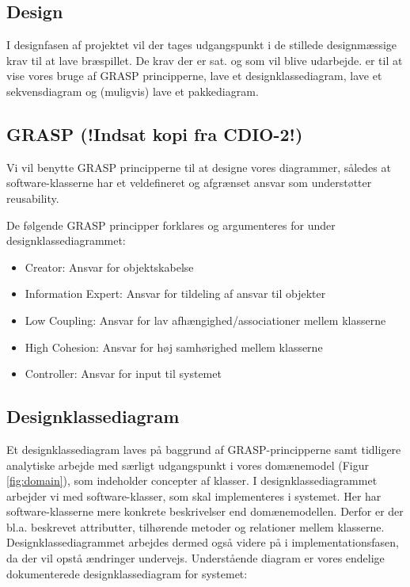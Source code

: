 \documentclass[../main.tex]{subfiles}
\begin{document}
\begin{flushleft} 
\section{Design}

I designfasen af projektet vil der tages udgangspunkt i de stillede designmæssige krav til at lave bræspillet. De krav der er sat. og som vil blive udarbejde. er til at vise vores bruge af GRASP principperne, lave et designklassediagram, lave et sekvensdiagram og (muligvis) lave et pakkediagram. 


\subsection{GRASP (!Indsat kopi fra CDIO-2!)}

Vi vil benytte GRASP principperne til at designe vores diagrammer, således at software-klasserne har et veldefineret og afgrænset ansvar som understøtter reusability. \newline

\vspace{5mm}
De følgende GRASP principper forklares og argumenteres for under designklassediagrammet:
\begin{itemize}
    \item Creator: Ansvar for objektskabelse
    \item Information Expert: Ansvar for tildeling af ansvar til objekter
    \item Low Coupling: Ansvar for lav afhængighed/associationer mellem klasserne
    \item High Cohesion: Ansvar for høj samhørighed mellem klasserne
    \item Controller: Ansvar for input til systemet
\end{itemize}



\subsection{Designklassediagram }

Et designklassediagram laves på baggrund af GRASP-principperne samt tidligere analytiske arbejde med særligt udgangspunkt i  vores domænemodel (Figur \ref{fig:domain}), som indeholder concepter af klasser. I designklassediagrammet arbejder vi med software-klasser, som skal implementeres i systemet. Her har software-klasserne mere konkrete beskrivelser end domænemodellen. Derfor er der bl.a. beskrevet attributter, tilhørende metoder og relationer mellem klasserne. Designklassediagrammet arbejdes dermed også videre på i implementationsfasen, da der vil opstå ændringer undervejs. Understående diagram er vores endelige dokumenterede designklassediagram for systemet:



\end{flushleft}
\end{document}
